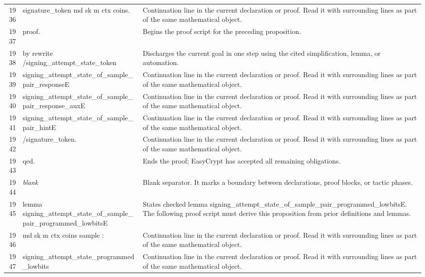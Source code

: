 \documentclass[10pt]{article}
\begin{document}
\begin{longtable}{r L{0.53\textwidth} L{0.37\textwidth}}
1936 & {\ttfamily\scriptsize   signature\_token md sk m ctx coins.} & Continuation line in the current declaration or proof.  Read it with surrounding lines as part of the same mathematical object. \\
1937 & {\ttfamily\scriptsize proof.} & Begins the proof script for the preceding proposition. \\
1938 & {\ttfamily\scriptsize by rewrite /signing\_attempt\_state\_token} & Discharges the current goal in one step using the cited simplification, lemma, or automation. \\
1939 & {\ttfamily\scriptsize            signing\_attempt\_state\_of\_sample\_pair\_responseE} & Continuation line in the current declaration or proof.  Read it with surrounding lines as part of the same mathematical object. \\
1940 & {\ttfamily\scriptsize            signing\_attempt\_state\_of\_sample\_pair\_response\_auxE} & Continuation line in the current declaration or proof.  Read it with surrounding lines as part of the same mathematical object. \\
1941 & {\ttfamily\scriptsize            signing\_attempt\_state\_of\_sample\_pair\_hintE} & Continuation line in the current declaration or proof.  Read it with surrounding lines as part of the same mathematical object. \\
1942 & {\ttfamily\scriptsize            /signature\_token.} & Continuation line in the current declaration or proof.  Read it with surrounding lines as part of the same mathematical object. \\
1943 & {\ttfamily\scriptsize qed.} & Ends the proof; EasyCrypt has accepted all remaining obligations. \\
1944 & {\ttfamily\scriptsize \emph{blank}} & Blank separator.  It marks a boundary between declarations, proof blocks, or tactic phases. \\
1945 & {\ttfamily\scriptsize lemma signing\_attempt\_state\_of\_sample\_pair\_programmed\_lowbitsE} & States checked lemma signing\_attempt\_state\_of\_sample\_pair\_programmed\_lowbitsE.  The following proof script must derive this proposition from prior definitions and lemmas. \\
1946 & {\ttfamily\scriptsize    md sk m ctx coins sample :} & Continuation line in the current declaration or proof.  Read it with surrounding lines as part of the same mathematical object. \\
1947 & {\ttfamily\scriptsize   signing\_attempt\_state\_programmed\_lowbits} & Continuation line in the current declaration or proof.  Read it with surrounding lines as part of the same mathematical object. \\

\end{longtable}
\end{document}
